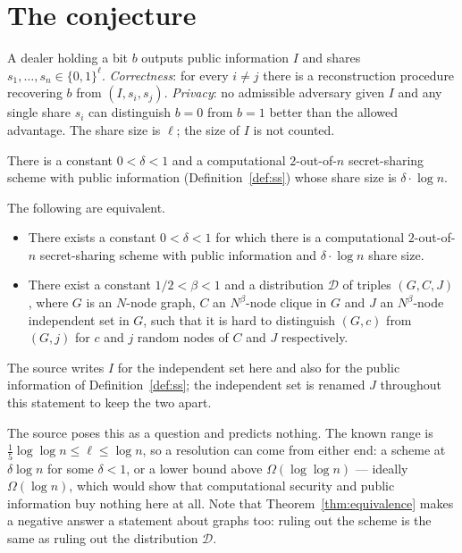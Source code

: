 \documentclass{aicr-conjecture}
\newcommand{\Om}{\Omega}
\begin{document}
\section{The conjecture}\label{sec:conjectures}

\begin{definition}\label{def:ss}
A dealer holding a bit $b$ outputs public information $I$ and shares
$s_{1},\dots,s_{n} \in \{0,1\}^{\ell}$. \emph{Correctness}: for every
$i \ne j$ there is a reconstruction procedure recovering $b$ from
$(I, s_{i}, s_{j})$. \emph{Privacy}: no admissible adversary given $I$
and any single share $s_{i}$ can distinguish $b = 0$ from $b = 1$ better
than the allowed advantage. The share size is $\ell$; the size of $I$ is
not counted.
\end{definition}

\begin{conjecture}\label{conj:main}
There is a constant $0 < \delta < 1$ and a computational
$2$-out-of-$n$ secret-sharing scheme with public information
(Definition~\ref{def:ss}) whose share size is $\delta \cdot \log n$.
\end{conjecture}

\begin{theorem}\label{thm:equivalence}
The following are equivalent.
\begin{itemize}[nosep]
  \item There exists a constant $0 < \delta < 1$ for which there is a
    computational $2$-out-of-$n$ secret-sharing scheme with public
    information and $\delta \cdot \log n$ share size.
  \item There exist a constant $1/2 < \beta < 1$ and a distribution
    $\mathcal{D}$ of triples $(G, C, J)$, where $G$ is an $N$-node graph,
    $C$ an $N^{\beta}$-node clique in $G$ and $J$ an $N^{\beta}$-node
    independent set in $G$, such that it is hard to distinguish $(G,c)$
    from $(G,j)$ for $c$ and $j$ random nodes of $C$ and $J$
    respectively.
\end{itemize}
The source writes $I$ for the independent set here and also for the
public information of Definition~\ref{def:ss}; the independent set is
renamed $J$ throughout this statement to keep the two apart.
\end{theorem}

\begin{remark}\label{rem:gap}
The source poses this as a question and predicts nothing. The known range
is $\frac{1}{5}\log\log n \le \ell \le \log n$, so a resolution can come
from either end: a scheme at $\delta\log n$ for some $\delta < 1$, or a
lower bound above $\Om(\log\log n)$ --- ideally $\Om(\log n)$, which would
show that computational security and public information buy nothing here
at all. Note that Theorem~\ref{thm:equivalence} makes a negative answer a
statement about graphs too: ruling out the scheme is the same as ruling
out the distribution $\mathcal{D}$.
\end{remark}
\end{document}
